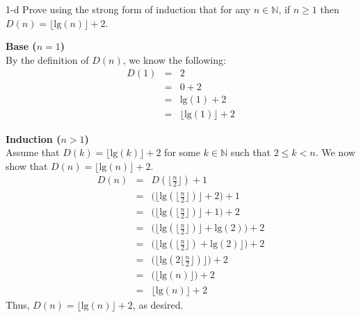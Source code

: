 \documentclass[11pt]{article}
\newcommand{\tlg}{\text{lg}}
\begin{document}
\begin{prob}{1-d}
Prove using the strong form of induction that for any $n \in \mathbb{N}$, if $n \geq 1$ then $D(n) = \lfloor \tlg(n) \rfloor + 2$.
\end{prob}
\begin{sol}
\textbf{Base ($n = 1$)} \\
By the definition of $D(n)$, we know the following:
\begin{eqnarray*}
D(1) & = & 2 \\ 
& = & 0 + 2 \\
& = & \tlg(1) + 2 \\
& = & \Big\lfloor\tlg(1)\Big\rfloor + 2 
\end{eqnarray*}

\textbf{Induction ($n > 1$)} \\
Assume that $D(k) = \Big\lfloor\tlg(k)\Big\rfloor + 2$ for some $k \in \mathbb{N}$ such that $2 \leq k < n$. We now show that $D(n) = \Big\lfloor\tlg(n)\Big\rfloor + 2$.
\begin{eqnarray*}
D(n) & = &  D(\Big\lfloor\frac{n}{2}\Big\rfloor) + 1 \\
& = & \Big(\Big\lfloor\tlg(\Big\lfloor\frac{n}{2}\Big\rfloor)\Big\rfloor + 2\Big) + 1 \\
& = & \Big(\Big\lfloor\tlg(\Big\lfloor\frac{n}{2}\Big\rfloor)\Big\rfloor + 1\Big) + 2 \\
& = & \Big(\Big\lfloor\tlg(\Big\lfloor\frac{n}{2}\Big\rfloor)\Big\rfloor + \tlg(2)\Big) + 2 \\
& = & \Big(\Big\lfloor\tlg(\Big\lfloor\frac{n}{2}\Big\rfloor) + \tlg(2)\Big\rfloor\Big) + 2 \\
& = & \Big(\Big\lfloor\tlg(2\Big\lfloor\frac{n}{2}\Big\rfloor)\Big\rfloor\Big) + 2 \\
& = & \Big(\Big\lfloor\tlg(n)\Big\rfloor\Big) + 2 \\
& = & \Big\lfloor\tlg(n)\Big\rfloor + 2
%
\end{eqnarray*}
Thus, $D(n) = \Big\lfloor\tlg(n)\Big\rfloor + 2$, as desired.
\end{sol}
\end{document}
